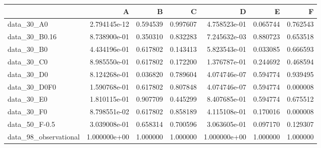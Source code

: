 \begin{tabular}{lrrrrrr}
\toprule
{} &             A &         B &         C &             D &         E &         F \\
\midrule
data\_30\_A0            &  2.794145e-12 &  0.594539 &  0.997607 &  4.758523e-01 &  0.065744 &  0.762543 \\
data\_30\_B0.16         &  8.738900e-01 &  0.350310 &  0.832283 &  7.245632e-03 &  0.880723 &  0.653518 \\
data\_30\_B0            &  4.434196e-01 &  0.617802 &  0.143413 &  5.823543e-01 &  0.033085 &  0.666593 \\
data\_30\_C0            &  8.985550e-01 &  0.617802 &  0.172200 &  1.376787e-01 &  0.244692 &  0.468594 \\
data\_30\_D0            &  8.124268e-01 &  0.036820 &  0.789604 &  4.074746e-07 &  0.594774 &  0.939495 \\
data\_30\_D0F0          &  1.590768e-01 &  0.617802 &  0.807848 &  4.074746e-07 &  0.594774 &  0.000008 \\
data\_30\_E0            &  1.810115e-01 &  0.907709 &  0.445299 &  8.407685e-01 &  0.594774 &  0.675512 \\
data\_30\_F0            &  8.798551e-02 &  0.617802 &  0.858189 &  4.115108e-01 &  0.170016 &  0.000008 \\
data\_50\_F-0.5         &  3.039008e-01 &  0.658314 &  0.700596 &  3.063605e-01 &  0.097170 &  0.129307 \\
data\_98\_observational &  1.000000e+00 &  1.000000 &  1.000000 &  1.000000e+00 &  1.000000 &  1.000000 \\
\bottomrule
\end{tabular}
